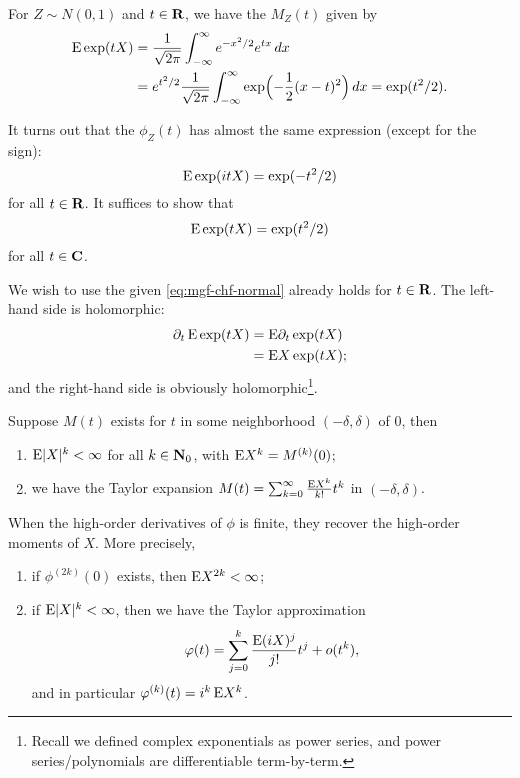 \begin{exa}
    For $Z \sim N(0,1)$ and $t\in \mathbf{R}$, we have the $M_Z(t)$ given by \begin{align*}
        \mathop{}\!\mathrm{E} \exp(tX) & = \frac{1}{\sqrt{2\pi}}\int_{-\infty}^\infty e^{-x^2/2} e^{tx} \,dx \\
        & = e^{t^2/2} \frac{1}{\sqrt{2\pi}} \int_{-\infty}^\infty \exp\Bigl(-\frac{1}{2}(x-t)^2\Bigr)\,dx = \exp(t^2/2).
    \end{align*}

    It turns out that the $\phi_Z(t)$ has almost the same expression (except for the sign): \[
        \mathop{}\!\mathrm{E} \exp(itX) = \exp(-t^2/2)
    \] for all $t\in \mathbf{R}$. It suffices to show that \begin{equation}
        \mathop{}\!\mathrm{E} \exp(tX) = \exp(t^2/2) \label{eq:mgf-chf-normal}
    \end{equation} for all $t\in \mathbf{C}$.
    
    We wish to use the  given \eqref{eq:mgf-chf-normal} already holds for $t\in \mathbf{R}$. The left-hand side is holomorphic: \begin{align*}
        \partial_t \mathop{}\!\mathrm{E}\exp(tX) & = \mathop{}\!\mathrm{E}\partial_t \exp(tX) \\
        & = \mathop{}\!\mathrm{E} X\exp(tX);
    \end{align*} and the right-hand side is obviously holomorphic\footnote{Recall we defined complex exponentials as power series, and power series/polynomials are differentiable term-by-term.}.
\end{exa}

\begin{namedthm}
    Suppose $M(t)$ exists for $t$ in some neighborhood $(-\delta,\delta)$ of $0$, then \begin{enumerate}
        \item $\mathop{}\!\mathrm{E} \lvert X \rvert^k < \infty$ for all $k\in \mathbf{N}_0$, with $\mathop{}\!\mathrm{E} X^k = M^{(k)}(0)$;
        \item we have the Taylor expansion $M(t) = \sum_{k=0}^\infty \frac{\mathop{}\!\mathrm{E} X^k}{k!} t^k$ in $(-\delta,\delta)$.
    \end{enumerate}
\end{namedthm}

\begin{namedthm} \leavevmode
When the high-order derivatives of $\phi$ is finite, they recover the high-order moments of $X$. More precisely, 
    \begin{enumerate}
        \item if $\phi^{(2k)}(0)$ exists, then $\mathop{}\!\mathrm{E} X^{2k} < \infty$;
        \item if $\mathop{}\!\mathrm{E} \lvert X \rvert^k <\infty$, then we have the Taylor approximation \[
            \varphi(t) = \sum_{j=0}^k\frac{\mathop{}\!\mathrm{E} (iX)^j}{j!} t^j + o(t^k),
        \] and in particular $\varphi^{(k)}(t) = i^k \mathop{}\!\mathrm{E} X^k$.
    \end{enumerate}
\end{namedthm}

